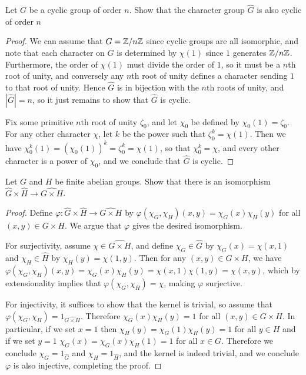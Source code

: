 \documentclass[11pt]{article}
\begin{document}
Let $G$ be a cyclic group of order $n$. Show that the character group $\hat G$ is also cyclic of order $n$
\begin{proof}
  We can assume that $G = \mathbb{Z}/n\mathbb{Z}$ since cyclic groups are all isomorphic, and note that each character on $G$ is determined by $\chi(1)$ since $1$ generates $\mathbb{Z}/n\mathbb{Z}$.
  Furthermore, the order of $\chi(1)$ must divide the order of $1$, so it must be a $n$th root of unity, and conversely any $n$th root of unity defines a character sending $1$ to that root of unity.
  Hence $\hat{G}$ is in bijection with the $n$th roots of unity, and $|\hat{G}| = n$, so it just remains to show that $\hat{G}$ is cyclic.

  Fix some primitive $n$th root of unity $\zeta_0$, and let $\chi_0$ be defined by $\chi_0(1) = \zeta_0$.
  For any other character $\chi$, let $k$ be the power such that $\zeta_0^k = \chi(1)$.
  Then we have $\chi_0^k(1) = (\chi_0(1))^k = \zeta_0^k = \chi(1)$, so that $\chi_0^k = \chi$, and every other character is a power of $\chi_0$, and we conclude that $\hat{G}$ is cyclic.
\end{proof}

Let $G$ and $H$ be finite abelian groups. Show that there is an isomorphism $\hat{G} \times \hat{H} \rightarrow \widehat{G \times H}$.
\begin{proof}
  Define $\varphi : \hat{G} \times \hat{H} \rightarrow \widehat{G \times H}$ by $\varphi(\chi_G, \chi_H)(x, y) = \chi_G(x)\chi_H(y)$ for all $(x,y) \in G \times H$.
  We argue that $\varphi$ gives the desired isomorphism.

  For surjectivity, assume $\chi \in \widehat{G \times H}$, and define $\chi_G \in \hat G$ by $\chi_G(x) = \chi(x, 1)$ and $\chi_H \in \hat H$ by $\chi_H(y) = \chi(1, y)$.
  Then for any $(x,y) \in G \times H$, we have $\varphi(\chi_G, \chi_H)(x, y) = \chi_G(x)\chi_H(y) = \chi(x,1)\chi(1,y) = \chi(x,y)$, which by extensionality implies that $\varphi(\chi_G, \chi_H) = \chi$, making $\varphi$ surjective.

  For injectivity, it suffices to show that the kernel is trivial, so assume that $\varphi(\chi_G, \chi_H) = 1_{\widehat{G \times H}}$.
  Therefore $\chi_G(x)\chi_H(y) = 1$ for all $(x,y) \in G \times H$.
  In particular, if we set $x = 1$ then $\chi_H(y) = \chi_G(1)\chi_H(y) = 1$ for all $y \in H$ and if we set $y = 1$ $\chi_G(x) = \chi_G(x)\chi_H(1) = 1$ for all $x \in G$.
  Therefore we conclude $\chi_G = 1_{\hat G}$ and $\chi_H = 1_{\hat H}$, and the kernel is indeed trivial, and we conclude $\varphi$ is also injective, completing the proof.
\end{proof}
\end{document}
